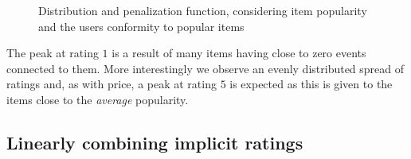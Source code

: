 \begin{figure}[H]
  \begin{subfigure}[b]{0.56\textwidth}
    \centering
  \end{subfigure}
  \begin{subfigure}[b]{0.5\textwidth}
    \centering
  \end{subfigure}
  \caption{Distribution and penalization function, considering item popularity
  and the users conformity to popular items}
  \label{fig:dist-popularity}
\end{figure}

The peak at rating $1$ is a result of many items having close to zero events
connected to them. More interestingly we observe an evenly distributed spread
of ratings and, as with price, a peak at rating $5$ is expected as this is
given to the items close to the \textit{average} popularity.

\subsection{Linearly combining implicit ratings}

